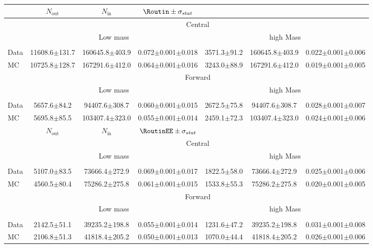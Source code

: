 
\begin{table}[hbtp]
 \renewcommand{\arraystretch}{1.3}
 \setlength{\belowcaptionskip}{6pt}
 \centering
 \caption{
     }
  \label{tab:rOutIn}
\begin{tabular}{l|c|c|cc|c|c}     
 & $N_{\text{out}}$ & $N_{\text{in}}$ & $ \Routin \pm \sigma_{stat}$  \\    
\hline
 & \multicolumn{6}{c}{Central} \\
 & \multicolumn{3}{c}{Low mass}  & \multicolumn{3}{c}{high Mass} \\ \\ 
\hline
 Data & 11608.6$\pm$131.7 & 160645.8$\pm$403.9 & 0.072$\pm$0.001$\pm$0.018 & 3571.3$\pm$91.2 & 160645.8$\pm$403.9 & 0.022$\pm$0.001$\pm$0.006 \\
 MC & 10725.8$\pm$128.7 & 167291.6$\pm$412.0 & 0.064$\pm$0.001$\pm$0.016 & 3243.0$\pm$88.9 & 167291.6$\pm$412.0 & 0.019$\pm$0.001$\pm$0.005 \\
 
 
    \hline 
& \multicolumn{6}{c}{Forward} \\
 & \multicolumn{3}{c}{Low mass}  & \multicolumn{3}{c}{high Mass} \\ \\ 
\hline
 Data & 5657.6$\pm$84.2 & 94407.6$\pm$308.7 & 0.060$\pm$0.001$\pm$0.015 & 2672.5$\pm$75.8 & 94407.6$\pm$308.7 & 0.028$\pm$0.001$\pm$0.007 \\
 MC & 5695.8$\pm$85.5 & 103407.4$\pm$323.0 & 0.055$\pm$0.001$\pm$0.014 & 2459.1$\pm$72.3 & 103407.4$\pm$323.0 & 0.024$\pm$0.001$\pm$0.006 \\


 & $N_{\text{out}}$ & $N_{\text{in}}$ & $ \RoutinEE \pm \sigma_{stat}$  \\    
\hline
 & \multicolumn{6}{c}{Central} \\
 & \multicolumn{3}{c}{Low mass}  & \multicolumn{3}{c}{high Mass} \\ \\ 
\hline
 Data & 5107.0$\pm$83.5 & 73666.4$\pm$272.9 & 0.069$\pm$0.001$\pm$0.017 & 1822.5$\pm$58.0 & 73666.4$\pm$272.9 & 0.025$\pm$0.001$\pm$0.006 \\
 MC & 4560.5$\pm$80.4 & 75286.2$\pm$275.8 & 0.061$\pm$0.001$\pm$0.015 & 1533.8$\pm$55.3 & 75286.2$\pm$275.8 & 0.020$\pm$0.001$\pm$0.005 \\
 
 
    \hline 
& \multicolumn{6}{c}{Forward} \\
 & \multicolumn{3}{c}{Low mass}  & \multicolumn{3}{c}{high Mass} \\ \\ 
\hline
 Data & 2142.5$\pm$51.1 & 39235.2$\pm$198.8 & 0.055$\pm$0.001$\pm$0.014 & 1231.6$\pm$47.2 & 39235.2$\pm$198.8 & 0.031$\pm$0.001$\pm$0.008 \\
 MC & 2106.8$\pm$51.3 & 41818.4$\pm$205.2 & 0.050$\pm$0.001$\pm$0.013 & 1070.0$\pm$44.4 & 41818.4$\pm$205.2 & 0.026$\pm$0.001$\pm$0.006 \\



\end{tabular}
\end{table}
